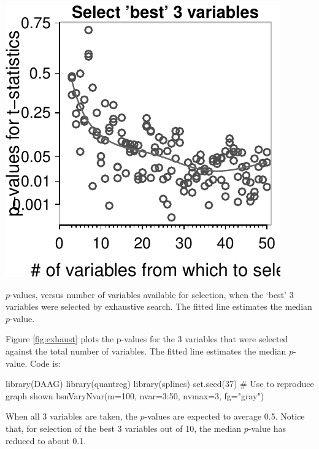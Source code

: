 \begin{marginfigure}[-84pt]
\begin{Schunk}


\centerline{\includegraphics[width=\textwidth]{figs/8-bsnVary-1} }

\end{Schunk}
\caption{$p$-values, versus number of variables available for selection,
  when the `best' 3 variables were selected by exhaustive search.
  The fitted line estimates the median $p$-value.\label{fig:exhaust}}
\end{marginfigure}
\noindent

Figure \ref{fig:exhaust} plots the p-values for the 3 variables that
were selected against the total number of variables. The fitted line
estimates the median $p$-value.
Code is:
\begin{Schunk}
\begin{Sinput}
library(DAAG)
library(quantreg)
library(splines)
set.seed(37)   # Use to reproduce graph shown
bsnVaryNvar(m=100, nvar=3:50, nvmax=3, fg="gray")
\end{Sinput}
\end{Schunk}

When all 3 variables are taken, the $p$-values are expected to average
0.5.  Notice that, for selection of the best 3 variables out of 10,
the median $p$-value has reduced to about 0.1.

